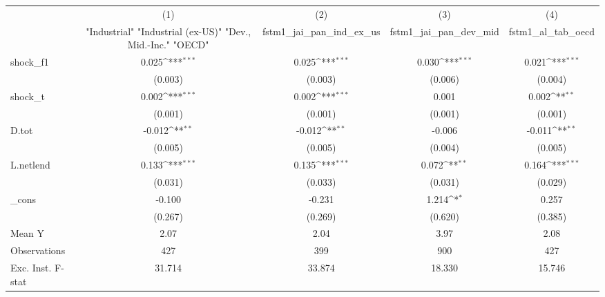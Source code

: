 {
\def\sym#1{\ifmmode^{#1}\else\(^{#1}\)\fi}
\begin{tabular}{l*{4}{c}}
\toprule
            &\multicolumn{1}{c}{(1)}&\multicolumn{1}{c}{(2)}&\multicolumn{1}{c}{(3)}&\multicolumn{1}{c}{(4)}\\
            &\multicolumn{1}{c}{ "Industrial" "Industrial (ex-US)" "Dev., Mid.-Inc." "OECD" }&\multicolumn{1}{c}{fstm1\_jai\_pan\_ind\_ex\_us}&\multicolumn{1}{c}{fstm1\_jai\_pan\_dev\_mid}&\multicolumn{1}{c}{fstm1\_al\_tab\_oecd}\\
\midrule
shock\_f1    &       0.025\sym{***}&       0.025\sym{***}&       0.030\sym{***}&       0.021\sym{***}\\
            &     (0.003)         &     (0.003)         &     (0.006)         &     (0.004)         \\
\addlinespace
shock\_t     &       0.002\sym{***}&       0.002\sym{***}&       0.001         &       0.002\sym{**} \\
            &     (0.001)         &     (0.001)         &     (0.001)         &     (0.001)         \\
\addlinespace
D.tot       &      -0.012\sym{**} &      -0.012\sym{**} &      -0.006         &      -0.011\sym{**} \\
            &     (0.005)         &     (0.005)         &     (0.004)         &     (0.005)         \\
\addlinespace
L.netlend   &       0.133\sym{***}&       0.135\sym{***}&       0.072\sym{**} &       0.164\sym{***}\\
            &     (0.031)         &     (0.033)         &     (0.031)         &     (0.029)         \\
\addlinespace
\_cons      &      -0.100         &      -0.231         &       1.214\sym{*}  &       0.257         \\
            &     (0.267)         &     (0.269)         &     (0.620)         &     (0.385)         \\
\midrule
Mean Y      &        2.07         &        2.04         &        3.97         &        2.08         \\
Observations&         427         &         399         &         900         &         427         \\
Exc. Inst. F-stat&      31.714         &      33.874         &      18.330         &      15.746         \\
\bottomrule
\end{tabular}
}
